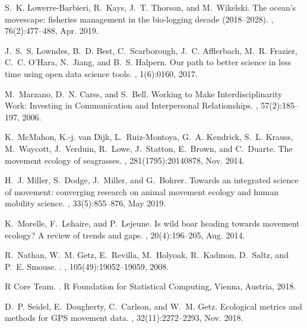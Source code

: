 \documentclass[a4paper,12pt]{article}
\begin{document}
\begin{thebibliography}{10}
	S.~K. Lowerre-Barbieri, R.~Kays, J.~T. Thorson, and M.~Wikelski.
	\newblock The ocean’s movescape: fisheries management in the bio-logging
	decade (2018–2028).
	, 76(2):477--488, Apr. 2019.
	
	J.~S.~S. Lowndes, B.~D. Best, C.~Scarborough, J.~C. Afflerbach, M.~R. Frazier,
	C.~C. O'Hara, N.~Jiang, and B.~S. Halpern.
	\newblock Our path to better science in less time using open data science
	tools.
	, 1(6):0160, 2017.
	
	M.~Marzano, D.~N. Carss, and S.~Bell.
	\newblock Working to {Make} {Interdisciplinarity} {Work}: {Investing} in
	{Communication} and {Interpersonal} {Relationships}.
	, 57(2):185--197, 2006.
	
	K.~McMahon, K.-j. van Dijk, L.~Ruiz-Montoya, G.~A. Kendrick, S.~L. Krauss,
	M.~Waycott, J.~Verduin, R.~Lowe, J.~Statton, E.~Brown, and C.~Duarte.
	\newblock The movement ecology of seagrasses.
	,
	281(1795):20140878, Nov. 2014.
	
	H.~J. Miller, S.~Dodge, J.~Miller, and G.~Bohrer.
	\newblock Towards an integrated science of movement: converging research on
	animal movement ecology and human mobility science.
	,
	33(5):855--876, May 2019.
	
	K.~Morelle, F.~Lehaire, and P.~Lejeune.
	\newblock Is wild boar heading towards movement ecology? {A} review of trends
	and gaps.
	, 20(4):196--205, Aug. 2014.
	
	R.~Nathan, W.~M. Getz, E.~Revilla, M.~Holyoak, R.~Kadmon, D.~Saltz, and P.~E.
	Smouse.
	.
	, 105(49):19052--19059, 2008.
	
	{R Core Team}.
	.
	\newblock R Foundation for Statistical Computing, Vienna, Austria, 2018.
	
	D.~P. Seidel, E.~Dougherty, C.~Carlson, and W.~M. Getz.
	\newblock Ecological metrics and methods for {GPS} movement data.
	,
	32(11):2272--2293, Nov. 2018.
	

\end{thebibliography}
\end{document}
